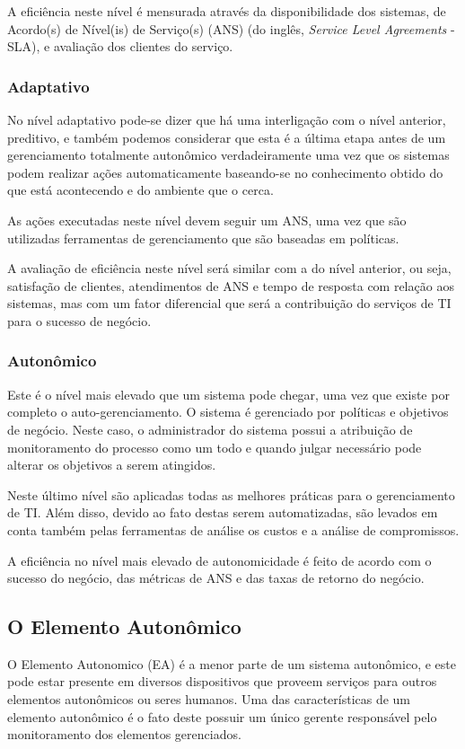 \documentclass[11pt,twoside]{article}
\begin{document}
A eficiência neste nível é mensurada através da disponibilidade dos sistemas, de Acordo(s) de Nível(is) de Serviço(s) (ANS) (do inglês, \textit{Service Level Agreements} - SLA), e avaliação dos clientes do serviço.

\subsubsection{Adaptativo}
No nível adaptativo pode-se dizer que há uma interligação com o nível anterior, preditivo, e também podemos considerar que esta é a última etapa antes de um gerenciamento totalmente autonômico verdadeiramente uma vez que os sistemas podem realizar ações automaticamente baseando-se no conhecimento obtido do que está acontecendo e do ambiente que o cerca. 

As ações executadas neste nível devem seguir um ANS, uma vez que são utilizadas ferramentas de gerenciamento que são baseadas em políticas.

A avaliação de eficiência neste nível será similar com a do nível anterior, ou seja, satisfação de clientes, atendimentos de ANS e tempo de resposta com relação aos sistemas, mas com um fator diferencial que será a contribuição do serviços de TI para o sucesso de negócio.

\subsubsection{Autonômico}
Este é o nível mais elevado que um sistema pode chegar, uma vez que existe por completo o auto-gerenciamento. O sistema é gerenciado por políticas e objetivos de negócio. Neste caso, o administrador do sistema possui a atribuição de monitoramento do processo como um todo e quando julgar necessário pode alterar os objetivos a serem atingidos. 

Neste último nível são aplicadas todas as melhores práticas para o gerenciamento de TI. Além disso, devido ao fato destas serem automatizadas, são levados em conta também pelas ferramentas de análise os custos e a análise de compromissos.

A eficiência no nível mais elevado de autonomicidade é feito de acordo com o sucesso do negócio, das métricas de ANS e das taxas de retorno do negócio.

\subsection{O Elemento Autonômico}
O Elemento Autonomico (EA) é a menor parte de um sistema autonômico, e este pode estar presente em diversos dispositivos que proveem serviços para outros elementos autonômicos ou seres humanos. Uma das características de um elemento autonômico é o fato deste possuir um único gerente responsável pelo monitoramento dos elementos gerenciados. 
\end{document}
